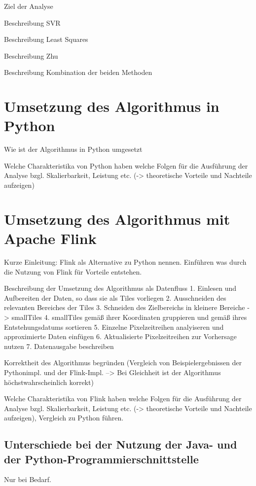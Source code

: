 Ziel der Analyse

Beschreibung SVR

Beschreibung Least Squares

Beschreibung Zhu

Beschreibung Kombination der beiden Methoden

\section{Umsetzung des Algorithmus in Python}

Wie ist der Algorithmus in Python umgesetzt

Welche Charakteristika von Python haben welche Folgen für die Ausführung der Analyse bzgl. Skalierbarkeit, Leistung etc. (-> theoretische Vorteile und Nachteile aufzeigen)

\section{Umsetzung des Algorithmus mit Apache Flink}
Kurze Einleitung: Flink als Alternative zu Python nennen.  Einführen was durch die Nutzung von Flink für Vorteile entstehen.

Beschreibung der Umsetzung des Algorithmus als Datenfluss
1. Einlesen und Aufbereiten der Daten, so dass sie als Tiles vorliegen
2. Ausschneiden des relevanten Bereiches der Tiles
3. Schneiden des Zielbereichs in kleinere Bereiche -> smallTiles
4. smallTiles gemäß ihrer Koordinaten gruppieren und gemäß ihres Entstehungsdatums sortieren
5. Einzelne Pixelzeitreihen analyiseren und approximierte Daten einfügen
6. Aktualisierte Pixelzeitreihen zur Vorhersage nutzen
7. Datenausgabe beschreiben

Korrektheit des Algorithmus begründen (Vergleich von Beispielergebnissen der Pythonimpl. und der Flink-Impl. --> Bei Gleichheit ist der Algorithmus höchstwahrscheinlich korrekt)


Welche Charakteristika von Flink haben welche Folgen für die Ausführung der Analyse bzgl. Skalierbarkeit, Leistung etc. (-> theoretische Vorteile und Nachteile aufzeigen), Vergleich zu Python führen.

\subsection{Unterschiede bei der Nutzung der Java- und der Python-Programmierschnittstelle}
Nur bei Bedarf.


